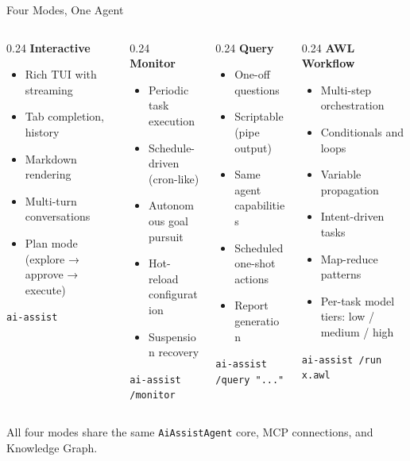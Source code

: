 \documentclass[aspectratio=169,10pt]{beamer}
\begin{document}
\begin{frame}{Four Modes, One Agent}
\begin{columns}[T]
\begin{column}{0.24\textwidth}
\textbf{\color{rhred}Interactive}
\begin{itemize}\scriptsize
  \item Rich TUI with streaming
  \item Tab completion, history
  \item Markdown rendering
  \item Multi-turn conversations
  \item \alert{Plan mode} (explore → approve → execute)
\end{itemize}
\smallskip
\texttt{\scriptsize ai-assist}
\end{column}
\begin{column}{0.24\textwidth}
\textbf{\color{rhblue}Monitor}
\begin{itemize}\scriptsize
  \item Periodic task execution
  \item Schedule-driven (cron-like)
  \item \alert{Autonomous goal pursuit}
  \item Hot-reload configuration
  \item Suspension recovery
\end{itemize}
\smallskip
\texttt{\scriptsize ai-assist /monitor}
\end{column}
\begin{column}{0.24\textwidth}
\textbf{\color{rhgreen}Query}
\begin{itemize}\scriptsize
  \item One-off questions
  \item Scriptable (pipe output)
  \item Same agent capabilities
  \item Scheduled one-shot actions
  \item Report generation
\end{itemize}
\smallskip
\texttt{\scriptsize ai-assist /query "..."}
\end{column}
\begin{column}{0.24\textwidth}
\textbf{\color{rhorange}AWL Workflow}
\begin{itemize}\scriptsize
  \item Multi-step orchestration
  \item Conditionals and loops
  \item Variable propagation
  \item Intent-driven tasks
  \item Map-reduce patterns
  \item Per-task model tiers: low / medium / high
\end{itemize}
\smallskip
\texttt{\scriptsize ai-assist /run x.awl}
\end{column}
\end{columns}

\vfill
\centering
\small All four modes share the same \texttt{AiAssistAgent} core, MCP connections, and Knowledge Graph.
\end{frame}
\end{document}

